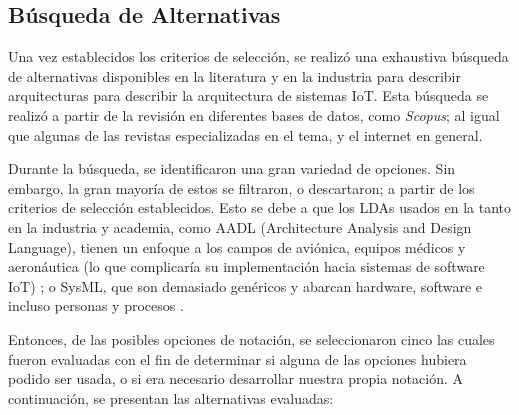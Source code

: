 \subsection{Búsqueda de Alternativas}

Una vez establecidos los criterios de selección, se realizó una exhaustiva búsqueda de alternativas disponibles en la literatura y en la industria para describir arquitecturas para describir la arquitectura de sistemas IoT. Esta búsqueda se realizó a partir de la revisión en diferentes bases de datos, como \textit{Scopus}; al igual que algunas de las revistas especializadas en el tema, y el internet en general.

Durante la búsqueda, se identificaron una gran variedad de opciones. Sin embargo, la gran mayoría de estos se filtraron, o descartaron; a partir de los criterios de selección establecidos. Esto se debe a que los LDAs usados en la tanto en la industria y academia, como AADL (Architecture Analysis and Design Language), tienen un enfoque a los campos de aviónica, equipos médicos y aeronáutica (lo que complicaría su implementación hacia sistemas de software IoT) \cite{aadl_web, aadl_pdf}; o SysML, que son demasiado genéricos y abarcan hardware, software e incluso personas y procesos \cite{omgsysml_2015}.

Entonces, de las posibles opciones de notación, se seleccionaron cinco las cuales fueron evaluadas con el fin de determinar si alguna de las opciones hubiera podido ser usada, o si era necesario desarrollar nuestra propia notación. A continuación, se presentan las alternativas evaluadas:

